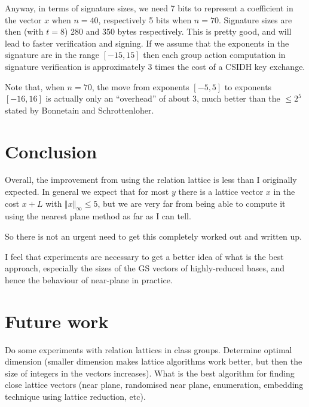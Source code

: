 \documentclass{llncs}
\begin{document}
Anyway, in terms of signature sizes, we need 7 bits to represent a coefficient in the vector $x$ when $n=40$, respectively 5 bits when $n=70$.
Signature sizes are then (with $t=8$) 280 and 350 bytes respectively.
This is pretty good, and will lead to faster verification and signing.
If we assume that the exponents in the signature are in the range $[-15, 15]$ then each group action computation in signature verification is approximately 3 times the cost of a CSIDH key exchange.


Note that, when $n=70$, the move from exponents $[-5,5]$ to exponents $[-16,16]$ is actually only an ``overhead'' of about 3, much better than the $\le 2^5$ stated by Bonnetain and Schrottenloher.


\section{Conclusion}

Overall, the improvement from using the relation lattice is less than I originally expected. In general we expect that for most $y$ there is a lattice vector $x$ in the cost $x + L$ with $\Vert x \Vert_\infty \le 5$, but we are very far from being able to compute it using the nearest plane method as far as I can tell.

So there is not an urgent need to get this completely worked out and written up.

I feel that experiments are necessary to get a better idea of what is the best approach, especially the sizes of the GS vectors of highly-reduced bases, and hence the behaviour of near-plane in practice.

\section{Future work}

Do some experiments with relation lattices in class groups.
Determine optimal dimension (smaller dimension makes lattice algorithms work better, but then the size of integers in the vectors increases).
What is the best algorithm for finding close lattice vectors (near plane, randomised near plane, enumeration, embedding technique using lattice reduction, etc).
\end{document}
